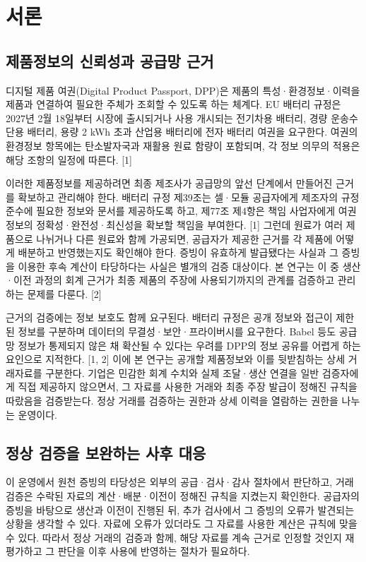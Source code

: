 \section{서론}
\subsection{제품정보의 신뢰성과 공급망 근거}
디지털 제품 여권(Digital Product Passport, DPP)은 제품의 특성·환경정보·이력을 제품과 연결하여 필요한 주체가 조회할 수 있도록 하는 체계다.
EU 배터리 규정은 2027년 2월 18일부터 시장에 출시되거나 사용 개시되는 전기차용 배터리, 경량 운송수단용 배터리, 용량 2 kWh 초과 산업용 배터리에 전자 배터리 여권을 요구한다.
여권의 환경정보 항목에는 탄소발자국과 재활용 원료 함량이 포함되며, 각 정보 의무의 적용은 해당 조항의 일정에 따른다. [1]

이러한 제품정보를 제공하려면 최종 제조사가 공급망의 앞선 단계에서 만들어진 근거를 확보하고 관리해야 한다.
배터리 규정 제39조는 셀·모듈 공급자에게 제조자의 규정 준수에 필요한 정보와 문서를 제공하도록 하고, 제77조 제4항은 책임 사업자에게 여권 정보의 정확성·완전성·최신성을 확보할 책임을 부여한다. [1]
그런데 원료가 여러 제품으로 나뉘거나 다른 원료와 함께 가공되면, 공급자가 제공한 근거를 각 제품에 어떻게 배분하고 반영했는지도 확인해야 한다.
증빙이 유효하게 발급됐다는 사실과 그 증빙을 이용한 후속 계산이 타당하다는 사실은 별개의 검증 대상이다.
본 연구는 이 중 생산·이전 과정의 회계 근거가 최종 제품의 주장에 사용되기까지의 관계를 검증하고 관리하는 문제를 다룬다. [2]

근거의 검증에는 정보 보호도 함께 요구된다.
배터리 규정은 공개 정보와 접근이 제한된 정보를 구분하며 데이터의 무결성·보안·프라이버시를 요구한다.
Babel 등도 공급망 정보가 통제되지 않은 채 확산될 수 있다는 우려를 DPP의 정보 공유를 어렵게 하는 요인으로 지적한다. [1, 2]
이에 본 연구는 공개할 제품정보와 이를 뒷받침하는 상세 거래자료를 구분한다.
기업은 민감한 회계 수치와 실제 조달·생산 연결을 일반 검증자에게 직접 제공하지 않으면서, 그 자료를 사용한 거래와 최종 주장 발급이 정해진 규칙을 따랐음을 검증받는다.
정상 거래를 검증하는 권한과 상세 이력을 열람하는 권한을 나누는 운영이다.


\subsection{정상 검증을 보완하는 사후 대응}
이 운영에서 원천 증빙의 타당성은 외부의 공급·검사·감사 절차에서 판단하고, 거래 검증은 수락된 자료의 계산·배분·이전이 정해진 규칙을 지켰는지 확인한다.
공급자의 증빙을 바탕으로 생산과 이전이 진행된 뒤, 추가 검사에서 그 증빙의 오류가 발견되는 상황을 생각할 수 있다.
자료에 오류가 있더라도 그 자료를 사용한 계산은 규칙에 맞을 수 있다.
따라서 정상 거래의 검증과 함께, 해당 자료를 계속 근거로 인정할 것인지 재평가하고 그 판단을 이후 사용에 반영하는 절차가 필요하다.

